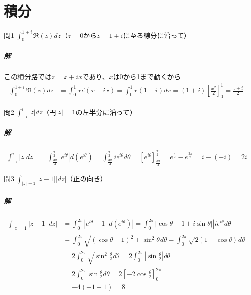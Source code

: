 \chapter{積分}%

\begin{mysimplebox}{問1}
   $\int_{0}^{1+i}\Re(z)dz$（$z=0$から$z=1+i$に至る線分に沿って）
\end{mysimplebox}
\paragraph{解}
この積分路では$z=x+ix$であり、$x$は0から1まで動くから
\begin{align*}
    \int_{0}^{1+i}\Re(z)dz
    &=\int_{0}^{1}xd(x+ix)
    =\int_{0}^{1}x(1+i)dx
    =(1+i)\left[\frac{x^2}{2}\right]_0^1
    =\frac{1+i}{2}
\end{align*}

\begin{mysimplebox}{問2}
    $\int_{-i}^{i}|z|dz$（円$|z|=1$の左半分に沿って）
 \end{mysimplebox}
 \paragraph{解}
 \begin{align*}
    \int_{-i}^{i}|z|dz
    &=\int_{\frac{3\pi}{2}}^{\frac{\pi}{2}}|e^{i\theta}|d(e^{i\theta})
    =\int_{\frac{3\pi}{2}}^{\frac{\pi}{2}}ie^{i\theta}d\theta
    =\left[e^{i\theta}\right]_{\frac{3\pi}{2}}^{\frac{\pi}{2}}
    =e^{\frac{\pi}{2}}-e^{\frac{3\pi}{2}}=i-(-i)=2i
\end{align*}

\begin{mysimplebox}{問3}
   $\int_{|z|=1}|z-1||dz|$（正の向き）
\end{mysimplebox}
\paragraph{解}
\begin{align*}
   \int_{|z|=1}|z-1||dz|
   &=\int_{0}^{2\pi}|e^{i\theta}-1||d(e^{i\theta})|
   =\int_{0}^{2\pi}|\cos \theta-1+i\sin \theta||ie^{i\theta}d\theta|\\
   &=\int_{0}^{2\pi}\sqrt{(\cos\theta-1)^2+\sin^2\theta}d\theta
   =\int_{0}^{2\pi}\sqrt{2(1-\cos\theta)}d\theta\\
   &=2\int_{0}^{2\pi}\sqrt{\sin^2\frac{\theta}{2}}d\theta
   =2\int_{0}^{2\pi}\left|\sin\frac{\theta}{2}\right|d\theta\\
   &=2\int_{0}^{2\pi}\sin\frac{\theta}{2}d\theta
   =2\left[-2\cos\frac{\theta}{2}\right]_0^{2\pi}\\
   &=-4(-1-1)=8
\end{align*}

